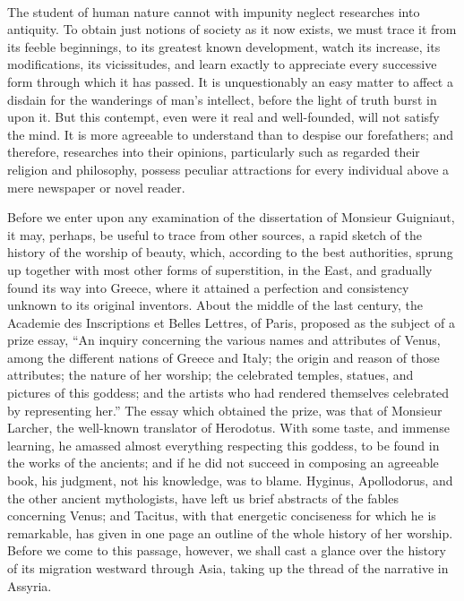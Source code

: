 \documentclass[a4paper, 11pt, oneside, polutonikogreek, english]{article}
\begin{document}
\paragraph{}
The student of human nature cannot with impunity neglect researches into antiquity. To obtain just notions of society as it now exists, we must trace it from its feeble beginnings, to its greatest known development, watch its increase, its modifications, its vicissitudes, and learn exactly to appreciate every successive form through which it has passed. It is unquestionably an easy matter to affect a disdain for the wanderings of man's intellect, before the light of truth burst in upon it. But this contempt, even were it real and well-founded, will not satisfy the mind. It is more agreeable to understand than to despise our forefathers; and therefore, researches into their opinions, particularly such as regarded their religion and philosophy, possess peculiar attractions for every individual above a mere newspaper or novel reader.

Before we enter upon any examination of the dissertation of Monsieur Guigniaut, it may, perhaps, be useful to trace from other sources, a rapid sketch of the history of the worship of beauty, which, according to the best authorities, sprung up together with most other forms of superstition, in the East, and gradually found its way into Greece, where it attained a perfection and consistency unknown to its original inventors. About the middle of the last century, the Academie des Inscriptions et Belles Lettres, of Paris, proposed as the subject of a prize essay, ``An inquiry concerning the various names and attributes of Venus, among the different nations of Greece and Italy; the origin and reason of those attributes; the nature of her worship; the celebrated temples, statues, and pictures of this goddess; and the artists who had rendered themselves celebrated by representing her.'' The essay which obtained the prize, was that of Monsieur Larcher, the well-known translator of Herodotus. With some taste, and immense learning, he amassed almost everything respecting this goddess, to be found in the works of the ancients; and if he did not succeed in composing an agreeable book, his judgment, not his knowledge, was to blame. Hyginus, Apollodorus, and the other ancient mythologists, have left us brief abstracts of the fables concerning Venus; and Tacitus, with that energetic conciseness for which he is remarkable, has given in one page an outline of the whole history of her worship. Before we come to this passage, however, we shall cast a glance over the history of its migration westward through Asia, taking up the thread of the narrative in Assyria.
\end{document}
